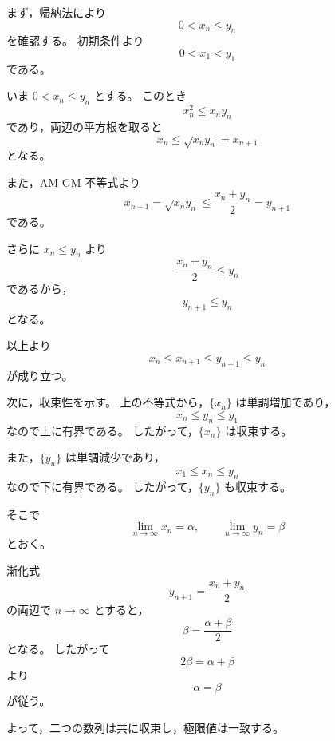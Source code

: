 \begin{strategy}
	まず，帰納法により
	\[
	0<x_n\leq y_n
	\]
	を確認する。
	初期条件より
	\[
	0<x_1<y_1
	\]
	である。
	
	いま \(0<x_n\leq y_n\) とする。
	このとき
	\[
	x_n^2\leq x_ny_n
	\]
	であり，両辺の平方根を取ると
	\[
	x_n\leq \sqrt{x_ny_n}=x_{n+1}
	\]
	となる。
	
	また，AM-GM 不等式より
	\[
	x_{n+1}
	=
	\sqrt{x_ny_n}
	\leq
	\frac{x_n+y_n}{2}
	=
	y_{n+1}
	\]
	である。
	
	さらに \(x_n\leq y_n\) より
	\[
	\frac{x_n+y_n}{2}\leq y_n
	\]
	であるから，
	\[
	y_{n+1}\leq y_n
	\]
	となる。
	
	以上より
	\[
	x_n\leq x_{n+1}
	\leq y_{n+1}
	\leq y_n
	\]
	が成り立つ。
	
	次に，収束性を示す。
	上の不等式から，\(\{x_n\}\) は単調増加であり，
	\[
	x_n\leq y_n\leq y_1
	\]
	なので上に有界である。
	したがって，\(\{x_n\}\) は収束する。
	
	また，\(\{y_n\}\) は単調減少であり，
	\[
	x_1\leq x_n\leq y_n
	\]
	なので下に有界である。
	したがって，\(\{y_n\}\) も収束する。
	
	そこで
	\[
	\lim_{n\to\infty}x_n=\alpha,
	\qquad
	\lim_{n\to\infty}y_n=\beta
	\]
	とおく。
	
	漸化式
	\[
	y_{n+1}=\frac{x_n+y_n}{2}
	\]
	の両辺で \(n\to\infty\) とすると，
	\[
	\beta=\frac{\alpha+\beta}{2}
	\]
	となる。
	したがって
	\[
	2\beta=\alpha+\beta
	\]
	より
	\[
	\alpha=\beta
	\]
	が従う。
	
	よって，二つの数列は共に収束し，極限値は一致する。
\end{strategy}